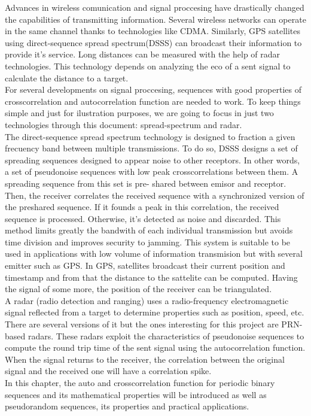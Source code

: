 Advances in wireless comunication and signal proccesing have drastically
changed the capabilities of transmitting information. Several wireless
networks can operate in the same channel thanks to technologies like
CDMA. Similarly, GPS\cite{GPS} satellites using direct-sequence spread
spectrum(DSSS) can broadcast their information to provide it's service. Long
distances can be measured with the help of radar technologies. This
technology depends on analyzing the eco of a sent signal to calculate the
distance to a target.\\

For several developments on signal proccesing, sequences with good properties
of crosscorrelation and autocorrelation function are needed to work. To keep
things simple and just for ilustration purposes, we are going to focus in just
two technologies through this document: spread-spectrum and radar.\\

The direct-sequence spread spectrum technology\cite{DSSS_1}\cite{DSSS} is
designed to fraction a given frecuency band between multiple transmissions. To
do so, DSSS designs a set of spreading sequences designed to appear noise to
other receptors. In other words, a set of pseudonoise sequences with low peak
crosscorrelations between them. A spreading sequence from this set is pre-
shared between emisor and receptor. Then, the receiver correlates the received
sequence with a synchronized version of the preshared sequence. If it founds a
peak in this correlation, the received sequence is processed. Otherwise, it's
detected as noise and discarded. This method limits greatly the bandwith of
each individual transmission but avoids time division and improves security to
jamming. This system is suitable to be used in applications with low volume
of information transmision but with several emitter such as GPS. In GPS,
satellites broadcast their current position and timestamp and from that
the distance to the sattelite can be computed. Having the signal of some more,
the position of the receiver can be triangulated.\\

A radar (radio detection and ranging) uses a radio-frequency electromagnetic
signal reflected from a target to determine properties such as position, speed,
etc. There are several versions of it but the ones interesting for this
project are PRN-based radars\cite{prn_radar_example1}\cite{prn_radar_example2}.
These radars exploit the characteristics of pseudonoise sequences to compute the
round trip time of the sent signal using the autocorrelation function. When
the signal returns to the receiver, the correlation between the original
signal and the received one will have a correlation spike.\\

In this chapter, the auto and crosscorrelation function for
periodic binary sequences and its mathematical properties will be introduced
as well as pseudorandom sequences, its properties and practical applications.

 
